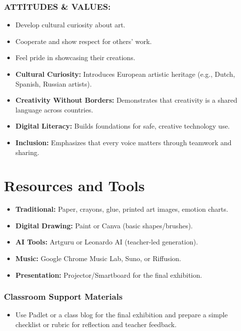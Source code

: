 \documentclass[11pt, a4paper]{article}
\begin{document}
\subsubsection*{ATTITUDES \& VALUES:}
\begin{itemize}
    \item Develop cultural curiosity about art.
    \item Cooperate and show respect for others' work.
    \item Feel pride in showcasing their creations.
\end{itemize}

\begin{eurobox}
\begin{itemize}
    \item \textbf{Cultural Curiosity:} Introduces European artistic heritage (e.g., Dutch, Spanish, Russian artists).
    \item \textbf{Creativity Without Borders:} Demonstrates that creativity is a shared language across countries.
    \item \textbf{Digital Literacy:} Builds foundations for safe, creative technology use.
    \item \textbf{Inclusion:} Emphasizes that every voice matters through teamwork and sharing.
\end{itemize}
\end{eurobox}

\newpage
\section{Resources and Tools}
\begin{itemize}
    \item \textbf{Traditional:} Paper, crayons, glue, printed art images, emotion charts.
    \item \textbf{Digital Drawing:} Paint or Canva (basic shapes/brushes).
    \item \textbf{AI Tools:} Artguru or Leonardo AI (teacher-led generation).
    \item \textbf{Music:} Google Chrome Music Lab, Suno, or Riffusion.
    \item \textbf{Presentation:} Projector/Smartboard for the final exhibition.
\end{itemize}

\subsubsection*{Classroom Support Materials}
\begin{itemize}
    \item Use Padlet or a class blog for the final exhibition and prepare a simple checklist or rubric for reflection and teacher feedback.
\end{itemize}
\end{document}
